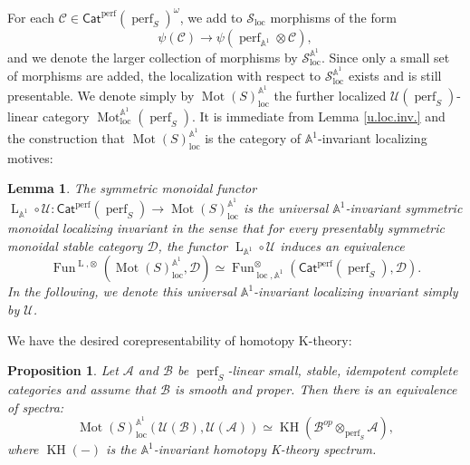 \documentclass{article}
\newtheorem{lm}[thm]{Lemma}
\newtheorem{prop}[thm]{Proposition}
\theoremstyle{definition}
\newcommand{\on}{\operatorname}
\begin{document}
For each $\mathcal{C}\in\mathsf{Cat}^{\on{perf}}(\on{perf}_S)^\omega$, we add to $\mathcal{S}_{\on{loc}}$ morphisms of the form\[
\psi(\mathcal{C})\rightarrow\psi(\on{perf}_{\mathbb{A}^1}\otimes\mathcal{C}),\]
and we denote the larger collection of morphisms by $\mathcal{S}_{\on{loc}}^{\mathbb{A}^1}$. Since only a small set of morphisms are added, the localization with respect to $\mathcal{S}_{\on{loc}}^{\mathbb{A}^1}$ exists and is still presentable. We denote simply by $\on{Mot}(S)_{\on{loc}}^{\mathbb{A}^1}$ the further localized $\mathcal{U}(\on{perf}_S)$-linear category $\on{Mot}_{\on{loc}}^{\mathbb{A}^1}(\on{perf}_S)$. It is immediate from Lemma \ref{u.loc.inv.} and the construction that $\on{Mot}(S)_{\on{loc}}^{\mathbb{A}^1}$ is the category of $\mathbb{A}^1$-invariant localizing motives:
\begin{lm}
The symmetric monoidal functor $\on{L}_{\mathbb{A}^1}\circ\mathcal{U}:\mathsf{Cat}^{\on{perf}}(\on{perf}_S)\rightarrow \on{Mot}(S)_{\on{loc}}^{\mathbb{A}^1}$ is the universal $\mathbb{A}^1$-invariant symmetric monoidal localizing invariant in the sense that for every presentably symmetric monoidal stable category $\mathcal{D}$, the functor $\on{L}_{\mathbb{A}^1}\circ\mathcal{U}$ induces an equivalence\[
\on{Fun}^{\on{L},\otimes}(\on{Mot}(S)_{\on{loc}}^{\mathbb{A}^1},\mathcal{D})\simeq \on{Fun}^\otimes_{\on{loc},\mathbb{A}^1}(\mathsf{Cat}^{\on{perf}}(\on{perf}_S),\mathcal{D}).
\]
In the following, we denote this universal $\mathbb{A}^1$-invariant localizing invariant simply by $\mathcal{U}$.
\end{lm}
We have the desired corepresentability of homotopy K-theory:
\begin{prop}\label{KH}
Let $\mathcal{A}$ and $\mathcal{B}$ be $\on{perf}_S$-linear small, stable, idempotent complete categories and assume that $\mathcal{B}$ is smooth and proper. Then there is an equivalence of spectra:
\[\on{Mot}(S)_{\on{loc}}^{\mathbb{A}^1}(\mathcal{U}(\mathcal{B}),\mathcal{U}(\mathcal{A}))\simeq \on{KH}(\mathcal{B}^{op}\otimes_{\on{perf}_S} \mathcal{A}),
\]
where $\on{KH}(-)$ is the $\mathbb{A}^1$-invariant homotopy K-theory spectrum.
\end{prop}
\end{document}
